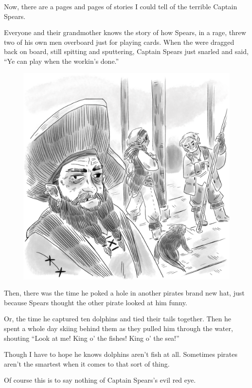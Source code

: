 \documentclass[12pt]{extbook}
\begin{document}
  Now, there are a pages and pages of stories I could tell of the terrible
  Captain Spears.
  
  Everyone and their grandmother knows the story of how Spears, in a rage,
  threw two of his own men overboard just for playing cards. When the were
  dragged back on board, still spitting and sputtering, Captain Spears
  just snarled and said, \enquote{Ye can play when the workin's done.}
  
  \begin{figure}[htbp]
  \centering
  \includegraphics{img/capt_spears.png}
  \caption{}
  \end{figure}
  
  Then, there was the time he poked a hole in another pirates brand new
  hat, just because Spears thought the other pirate looked at him funny.
  
  Or, the time he captured ten dolphins and tied their tails together.
  Then he spent a whole day skiing behind them as they pulled him through
  the water, shouting \enquote{Look at me! King o' the fishes! King o' the
  sea!}
  
  Though I have to hope he knows dolphins aren't fish at all. Sometimes
  pirates aren't the smartest when it comes to that sort of thing.
  
  Of course this is to say nothing of Captain Spears's evil red eye.
  
\end{document}
